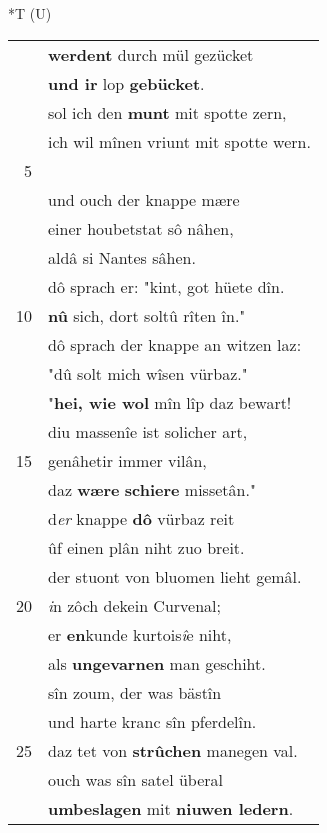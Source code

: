 \documentclass[8pt,a4paper,notitlepage]{article}
\begin{document}
\begin{table}[ht]
\begin{minipage}[t]{0.5\linewidth}
\end{minipage}
\hspace{0.5cm}
\begin{minipage}[t]{0.5\linewidth}
\small
\begin{center}*T (U)
\end{center}
\begin{tabular}{rl}
 & \textbf{werdent} durch mül gezücket\\ 
 & \textbf{und ir} lop \textbf{gebücket}.\\ 
 & sol ich den \textbf{munt} mit spotte zern,\\ 
 & ich wil mînen vriunt mit spotte wern.\\ 
5 & \textbf{\begin{large}S\end{large}us} kam der vischære\\ 
 & und ouch der knappe mære\\ 
 & einer houbetstat sô nâhen,\\ 
 & aldâ si Nantes sâhen.\\ 
 & dô sprach er: "kint, got hüete dîn.\\ 
10 & \textbf{nû} sich, dort soltû rîten în."\\ 
 & dô sprach der knappe an witzen laz:\\ 
 & "dû solt mich wîsen vürbaz."\\ 
 & "\textbf{hei, wie wol} mîn lîp daz bewart!\\ 
 & diu massenîe ist solicher art,\\ 
15 & genâhetir immer vilân,\\ 
 & daz \textbf{wære} \textbf{schiere} missetân."\\ 
 & d\textit{er} knappe \textbf{dô} vürbaz reit\\ 
 & ûf einen plân niht zuo breit.\\ 
 & der stuont von bluomen lieht gemâl.\\ 
20 & \textit{i}n zôch dekein Curvenal;\\ 
 & er \textbf{en}kunde kurtois\textit{î}e niht,\\ 
 & als \textbf{ungevarnen} man geschiht.\\ 
 & sîn zoum, der was bästîn\\ 
 & und harte kranc sîn pferdelîn.\\ 
25 & daz tet von \textbf{strûchen} manegen val.\\ 
 & ouch was sîn satel überal\\ 
 & \textbf{umbeslagen} mit \textbf{niuwen ledern}.\\ 

\end{tabular}
\end{minipage}
\end{table}
\end{document}
